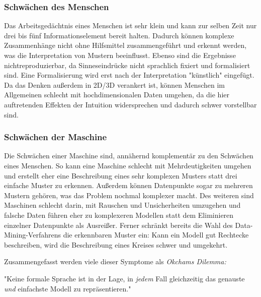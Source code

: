 			\subsubsection{Schwächen des Menschen}
				Das Arbeitsgedächtnis eines Menschen ist sehr klein und kann zur selben Zeit nur drei bis fünf Informationselement bereit halten. Dadurch können komplexe Zusammenhänge nicht ohne Hilfsmittel zusammengeführt und erkennt werden, was die Interpretation von Mustern beeinflusst. Ebenso sind die Ergebnisse nichtreproduzierbar, da Sinneseindrücke nicht sprachlich fixiert und formalisiert sind. Eine Formalisierung wird erst nach der Interpretation "künstlich" eingefügt. Da das Denken außerdem in 2D/3D verankert ist, können Menschen im Allgemeinen schlecht mit hochdimensionalen Daten umgehen, da die hier auftretenden Effekten der Intuition widersprechen und dadurch schwer vorstellbar sind.

			\subsubsection{Schwächen der Maschine}
				Die Schwächen einer Maschine sind, annähernd komplementär zu den Schwächen eines Menschen. So kann eine Maschine \bspw schlecht mit Mehrdeutigkeiten umgehen und erstellt eher eine Beschreibung eines sehr komplexen Musters statt drei einfache Muster zu erkennen. Außerdem können Datenpunkte sogar zu mehreren Mustern gehören, was das Problem nochmal komplexer macht. Des weiteren sind Maschinen schlecht darin, mit Rauschen und Unsicherheiten umzugehen und falsche Daten führen eher zu komplexeren Modellen statt dem Eliminieren einzelner Datenpunkte als Ausreißer. Ferner schränkt bereits die Wahl des Data-Mining-Verfahrens die erkennbaren Muster ein: Kann ein Modell \bspw gut Rechtecke beschreiben, wird die Beschreibung eines Kreises schwer und umgekehrt.

				Zusammengefasst werden viele dieser Symptome als \emph{Okchams Dilemma:}
				\begin{center}
					"Keine formale Sprache ist in der Lage, in \emph{jedem} Fall gleichzeitig das genauste \emph{und} einfachste Modell zu repräsentieren."
				\end{center}


